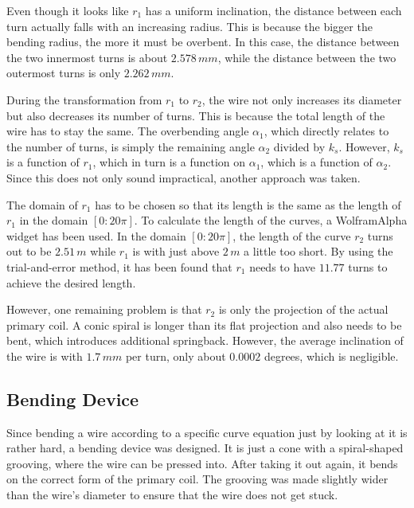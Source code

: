 Even though it looks like \(r_1\) has a uniform inclination, the distance between each turn actually falls with an increasing radius. This is because the bigger the bending radius, the more it must be overbent. In this case, the distance between the two innermost turns is about \(2.578\,mm\), while the distance between the two outermost turns is only \(2.262\,mm\).

During the transformation from \(r_1\) to \(r_2\), the wire not only increases its diameter but also decreases its number of turns. This is because the total length of the wire has to stay the same. The overbending angle \(\alpha_1\), which directly relates to the number of turns, is simply the remaining angle \(\alpha_2\) divided by \(k_s\). However, \(k_s\) is a function of \(r_1\), which in turn is a function on \(\alpha_1\), which is a function of \(\alpha_2\). Since this does not only sound impractical, another approach was taken.

The domain of \(r_1\) has to be chosen so that its length is the same as the length of \(r_1\) in the domain \([0:20\pi]\). To calculate the length of the curves, a WolframAlpha widget has been used. In the domain \([0:20\pi]\), the length of the curve \(r_2\) turns out to be \(2.51\,m\) while \(r_1\) is with just above \(2\,m\) a little too short. By using the trial-and-error method, it has been found that \(r_1\) needs to have \(11.77\) turns to achieve the desired length.

However, one remaining problem is that \(r_2\) is only the projection of the actual primary coil. A conic spiral is longer than its flat projection and also needs to be bent, which introduces additional springback. However, the average inclination of the wire is with \(1.7\,mm\) per turn, only about \(0.0002\) degrees, which is negligible.

\subsection{Bending Device}

Since bending a wire according to a specific curve equation just by looking at it is rather hard, a bending device was designed. It is just a cone with a spiral-shaped grooving, where the wire can be pressed into. After taking it out again, it bends on the correct form of the primary coil. The grooving was made slightly wider than the wire’s diameter to ensure that the wire does not get stuck.

